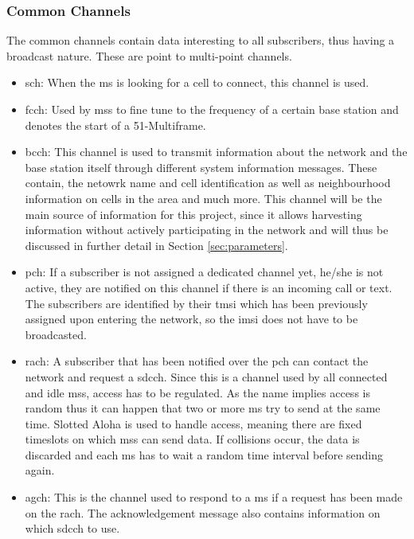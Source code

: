 \subsubsection{Common Channels}
The common channels contain data interesting to all subscribers, thus having a broadcast nature.
These are point to multi-point channels.
\begin{itemize}
	\item \gls{sch}: When the \gls{ms} is looking for a cell to connect, this channel is used.
	\item \gls{fcch}: Used by \glspl{ms} to fine tune to the frequency of a certain base station and denotes the start of a 51-Multiframe.
	\item \gls{bcch}: This channel is used to transmit information about the network and the base station itself through different system information messages.
	These contain, the netowrk name and cell identification as well as neighbourhood information on cells in the area and much more.
	This channel will be the main source of information for this project, since it allows harvesting information without actively participating in the network and will thus be discussed in further detail in Section \ref{sec:parameters}.
	\item \gls{pch}: If a subscriber is not assigned a dedicated channel yet, \ie he/she is not active, they are notified on this channel if there is an incoming call or text.
	The subscribers are identified by their \gls{tmsi} which has been previously assigned upon entering the network, so the \gls{imsi} does not have to be broadcasted.
	\item \gls{rach}: A subscriber that has been notified over the \gls{pch} can contact the network and request a \gls{sdcch}.
	Since this is a channel used by all connected and idle \glspl{ms}, access has to be regulated.
	As the name implies access is random thus it can happen that two or more \gls{ms} try to send at the same time.
	Slotted Aloha is used to handle access, meaning there are fixed timeslots on which \glspl{ms} can send data.
	If collisions occur, the data is discarded and each \gls{ms} has to wait a random time interval before sending again.
	\item \gls{agch}: This is the channel used to respond to a \gls{ms} if a request has been made on the \gls{rach}.
	The acknowledgement message also contains information on which \gls{sdcch} to use.
\end{itemize}
